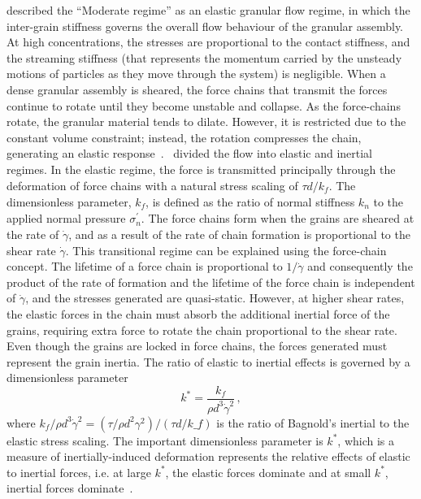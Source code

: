 \citet{Campbell2002} described the ``Moderate regime'' as an elastic granular 
flow regime, in which the inter-grain stiffness governs the overall flow 
behaviour of the granular assembly. At high concentrations, the stresses are 
proportional to the contact stiffness, and the streaming stiffness (that  
represents the momentum carried by the unsteady motions of particles as they
move through the system) is negligible. When a dense granular assembly is 
sheared, the force chains that transmit the forces continue to rotate until 
they become unstable and collapse. As the force-chains rotate, the granular 
material tends to dilate. However, it is restricted due to the constant volume
 constraint; instead, the rotation 
compresses the chain, generating an elastic 
response~\citep{Campbell2006}.~\citet{Campbell2002} divided the flow into 
elastic and inertial regimes. In the elastic regime, the force is 
transmitted principally through the deformation of force chains with a natural 
stress scaling of $\tau \mathit{d}/\mathit{k_f}$. The dimensionless parameter, 
$\mathit{k_f}$, is defined as the ratio of normal stiffness $k_n$ to 
the applied normal pressure $\sigma_n^\prime$. The force 
chains form when the grains are sheared at the rate of $\dot{\gamma}$, and 
as a result of the rate of chain formation is proportional to the shear rate 
$\dot{\gamma}$. This transitional regime can be explained using the force-chain 
concept. The lifetime of a force chain is proportional to $1/\dot{\gamma}$ and
consequently the product of the rate of formation and the lifetime of the force 
chain is independent of $\dot{\gamma}$, and the stresses generated are 
quasi-static. However, at higher shear rates, the elastic forces in the chain 
must absorb the additional inertial force of the grains, requiring extra force 
to rotate the chain proportional to the shear rate. Even though the grains are 
locked in force chains, the forces generated must represent the grain inertia. 
The ratio of elastic to inertial effects is governed by a dimensionless 
parameter
%
\begin{equation}
\textit{k}^{*} = \frac{k_f}{\rho \textit{d}^{3} \dot{\gamma}^{2}} \,,
\end{equation}
%
where ${k_f}/{\rho \textit{d}^{3} \dot{\gamma}^{2}}=({\tau}/{\rho 
\textit{d}^{2} 
{\gamma}^{2}})/(\tau\textit{d}/\textit{k_f})$ is the ratio of Bagnold's 
inertial 
to the elastic stress scaling. The important dimensionless parameter is 
$\textit{k}^{*}$, which is a measure of inertially-induced deformation 
represents the relative effects of elastic to inertial forces, i.e. at large 
$\textit{k}^{*}$, the elastic forces dominate and at small $\textit{k}^{*}$, 
inertial forces dominate~\citep{Campbell2006}.

